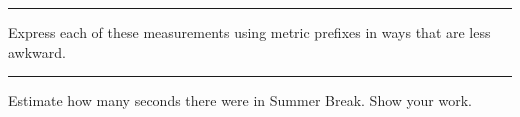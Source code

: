 \documentclass[12pt]{exam}
\begin{document}
\begin{questions}
\vfill \hrule \vfill

\question 
  Express each of these measurements using metric prefixes in ways that are less awkward.


\vfill \hrule \vfill

\question 
  Estimate how many seconds there were in Summer Break.  Show your work.



\end{questions}
\end{document}
